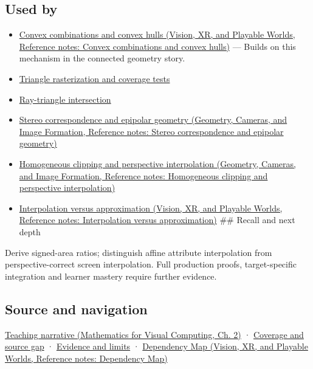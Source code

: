 \subsection{Used by}\label{appendix-02b9d9a81dca-used-by}

\hypertarget{appendix-02b9d9a81dca-used-by}{}

\begin{itemize}
\item
  \href{../07-Vision-XR-and-Playable-Worlds/main.pdf\#nameddest=appendix-0026ec42c9d5}{Convex combinations and convex hulls (Vision, XR, and Playable Worlds, Reference notes: Convex combinations and convex hulls)} --- Builds on this mechanism in the connected geometry story.
\item
  \hyperref[appendix-ed3f9bc298fe]{Triangle rasterization and coverage tests}
\item
  \hyperref[appendix-47ac1bd6d144]{Ray-triangle intersection}
\item
  \href{../03-Geometry-Cameras-and-Image-Formation/main.pdf\#nameddest=appendix-c4e98b6e4001}{Stereo correspondence and epipolar geometry (Geometry, Cameras, and Image Formation, Reference notes: Stereo correspondence and epipolar geometry)}
\item
  \href{../03-Geometry-Cameras-and-Image-Formation/main.pdf\#nameddest=appendix-40426e4b2103}{Homogeneous clipping and perspective interpolation (Geometry, Cameras, and Image Formation, Reference notes: Homogeneous clipping and perspective interpolation)}
\item
  \href{../07-Vision-XR-and-Playable-Worlds/main.pdf\#nameddest=appendix-0c2a5f69851e}{Interpolation versus approximation (Vision, XR, and Playable Worlds, Reference notes: Interpolation versus approximation)} \#\# Recall and next depth
\end{itemize}

Derive signed-area ratios; distinguish affine attribute interpolation from perspective-correct screen interpolation. Full production proofs, target-specific integration and learner mastery require further evidence.

\subsection{Source and navigation}\label{appendix-02b9d9a81dca-source-and-navigation}

\hypertarget{appendix-02b9d9a81dca-source-and-navigation}{}

\href{../02-Mathematics-for-Visual-Computing/main.pdf\#nameddest=01-foundations-i-ch018-the-sensor-needs-coordinates-inside-the-triangle}{Teaching narrative (Mathematics for Visual Computing, Ch. 2)} · \hyperref[appendix-fd090d982a15-phase-6---parts-501-600]{Coverage and source gap} · \hyperref[appendix-a103e7846d21-phase-6---source-analysis-and-verification]{Evidence and limits} · \href{../07-Vision-XR-and-Playable-Worlds/main.pdf\#nameddest=appendix-4ad47bdd269a}{Dependency Map (Vision, XR, and Playable Worlds, Reference notes: Dependency Map)}

